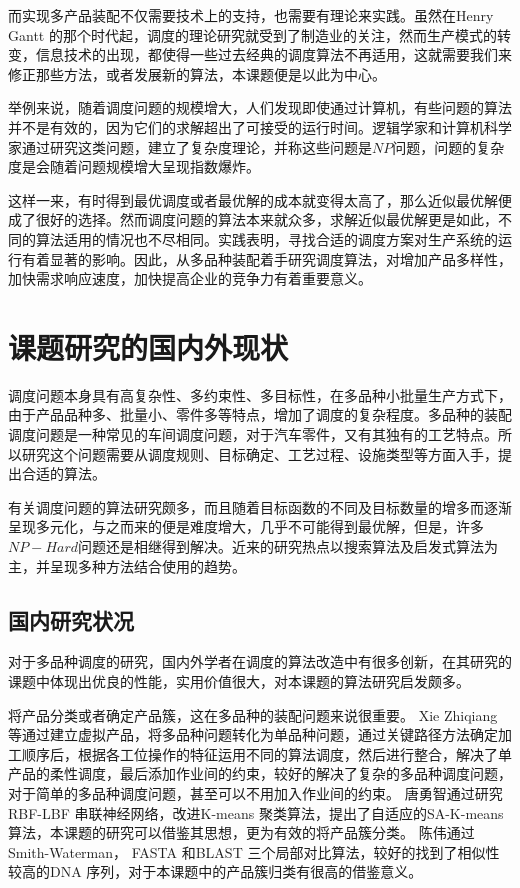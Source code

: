 而实现多产品装配不仅需要技术上的支持，也需要有理论来实践。虽然在Henry Gantt 的那个时代起，调度的理论研究就受到了制造业的关注，然而生产模式的转变，信息技术的出现，都使得一些过去经典的调度算法不再适用，这就需要我们来修正那些方法，或者发展新的算法，本课题便是以此为中心。

举例来说，随着调度问题的规模增大，人们发现即使通过计算机，有些问题的算法并不是有效的，因为它们的求解超出了可接受的运行时间。逻辑学家和计算机科学家通过研究这类问题，建立了复杂度理论，并称这些问题是$NP$问题，问题的复杂度是会随着问题规模增大呈现指数爆炸。

这样一来，有时得到最优调度或者最优解的成本就变得太高了，那么近似最优解便成了很好的选择。然而调度问题的算法本来就众多，求解近似最优解更是如此，不同的算法适用的情况也不尽相同。实践表明，寻找合适的调度方案对生产系统的运行有着显著的影响。因此，从多品种装配着手研究调度算法，对增加产品多样性，加快需求响应速度，加快提高企业的竞争力有着重要意义。


\section{课题研究的国内外现状}
调度问题本身具有高复杂性、多约束性、多目标性，在多品种小批量生产方式下，由于产品品种多、批量小、零件多等特点，增加了调度的复杂程度。多品种的装配调度问题是一种常见的车间调度问题，对于汽车零件，又有其独有的工艺特点。所以研究这个问题需要从调度规则、目标确定、工艺过程、设施类型等方面入手，提出合适的算法。

有关调度问题的算法研究颇多，而且随着目标函数的不同及目标数量的增多而逐渐呈现多元化，与之而来的便是难度增大，几乎不可能得到最优解，但是，许多$NP - Hard$问题还是相继得到解决。近来的研究热点以搜索算法及启发式算法为主，并呈现多种方法结合使用的趋势。
\subsection{国内研究状况}
对于多品种调度的研究，国内外学者在调度的算法改造中有很多创新，在其研究的课题中体现出优良的性能，实用价值很大，对本课题的算法研究启发颇多。

将产品分类或者确定产品簇，这在多品种的装配问题来说很重要。
Xie Zhiqiang\cite{xie2010study} 等通过建立虚拟产品，将多品种问题转化为单品种问题，通过关键路径方法确定加工顺序后，根据各工位操作的特征运用不同的算法调度，然后进行整合，解决了单产品的柔性调度，最后添加作业间的约束，较好的解决了复杂的多品种调度问题，对于简单的多品种调度问题，甚至可以不用加入作业间的约束。
唐勇智\cite{唐勇智2009基于聚类的}通过研究RBF-LBF 串联神经网络，改进K-means 聚类算法，提出了自适应的SA-K-means 算法，本课题的研究可以借鉴其思想，更为有效的将产品簇分类。
陈伟\cite{陈伟2006生物信息学中的序列相似性比对算法}通过Smith-Waterman， FASTA 和BLAST 三个局部对比算法，较好的找到了相似性较高的DNA 序列，对于本课题中的产品簇归类有很高的借鉴意义。

